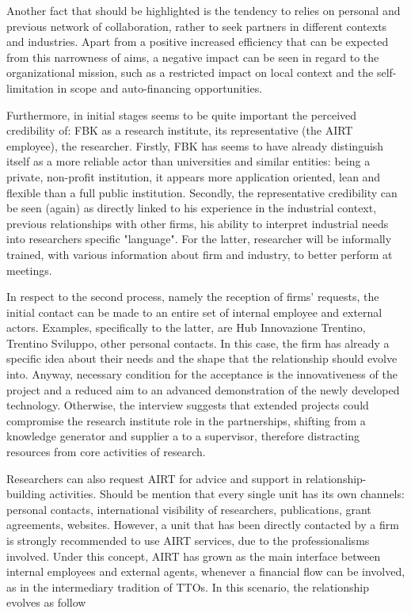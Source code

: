 Another fact that should be highlighted is the tendency to relies on personal and previous network of collaboration, rather to seek partners in different contexts and industries. Apart from a positive increased efficiency that can be expected from this narrowness of aims, a negative impact can be seen in regard to the organizational mission, such as a restricted impact on local context and the self-limitation in scope and auto-financing opportunities.

Furthermore, in initial stages seems to be quite important the perceived credibility of: FBK as a research institute, its representative (the AIRT employee), the researcher. Firstly, FBK has seems to have already distinguish itself as a more reliable actor than universities and similar entities: being a private, non-profit institution, it appears more application oriented, lean and flexible than a full public institution. Secondly, the representative credibility can be seen (again) as directly linked to his experience in the industrial context, previous relationships with other firms, his ability to interpret industrial needs into researchers specific "language". For the latter, researcher will be informally trained, with various information about firm and industry, to better perform at meetings.

In respect to the second process, namely the reception of firms’ requests, the initial contact can be made to an entire set of internal employee and external actors. Examples, specifically to the latter, are Hub Innovazione Trentino, Trentino Sviluppo, other personal contacts. In this case, the firm has already a specific idea about their needs and the shape that the relationship should evolve into. Anyway, necessary condition for the acceptance is the innovativeness of the project and a reduced aim to an advanced demonstration of the newly developed technology. Otherwise, the interview suggests that extended projects could compromise the research institute role in the partnerships, shifting from a knowledge generator and supplier a to a supervisor, therefore distracting resources from core activities of research.

Researchers can also request AIRT for advice and support in relationship-building activities. Should be mention that every single unit has its own channels: personal contacts, international visibility of researchers, publications, grant agreements, websites. However, a unit that has been directly contacted by a firm is strongly recommended to use AIRT services, due to the professionalisms involved. Under this concept, AIRT has grown as the main interface between internal employees and external agents, whenever a financial flow can be involved, as in the intermediary tradition of TTOs.
In this scenario, the relationship evolves as follow

